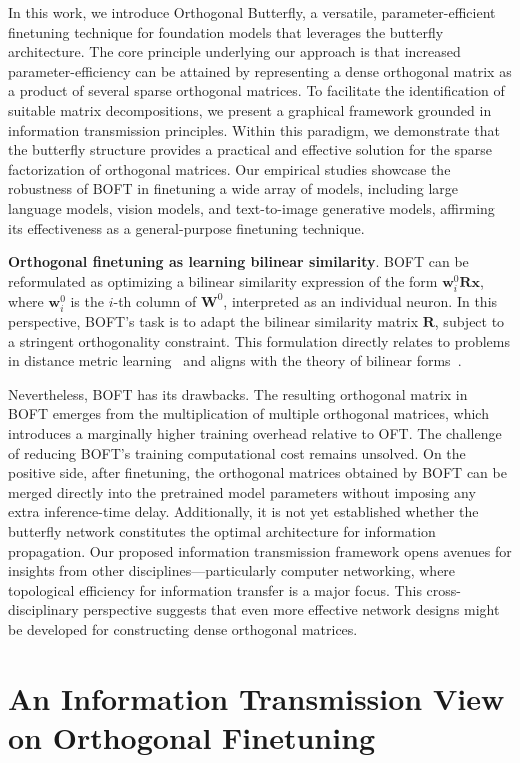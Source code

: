 In this work, we introduce Orthogonal Butterfly, a versatile, parameter-efficient finetuning technique for foundation models that leverages the butterfly architecture. The core principle underlying our approach is that increased parameter-efficiency can be attained by representing a dense orthogonal matrix as a product of several sparse orthogonal matrices. To facilitate the identification of suitable matrix decompositions, we present a graphical framework grounded in information transmission principles. Within this paradigm, we demonstrate that the butterfly structure provides a practical and effective solution for the sparse factorization of orthogonal matrices. Our empirical studies showcase the robustness of BOFT in finetuning a wide array of models, including large language models, vision models, and text-to-image generative models, affirming its effectiveness as a general-purpose finetuning technique.

\textbf{Orthogonal finetuning as learning bilinear similarity}. BOFT can be reformulated as optimizing a bilinear similarity expression of the form $\bm{w}^0_i\bm{R}\bm{x}$, where $\bm{w}^0_i$ is the $i$-th column of $\bm{W}^0$, interpreted as an individual neuron. In this perspective, BOFT’s task is to adapt the bilinear similarity matrix $\bm{R}$, subject to a stringent orthogonality constraint. This formulation directly relates to problems in distance metric learning~\cite{xing2002distance} and aligns with the theory of bilinear forms~\cite{roman2005advanced}.

Nevertheless, BOFT has its drawbacks. The resulting orthogonal matrix in BOFT emerges from the multiplication of multiple orthogonal matrices, which introduces a marginally higher training overhead relative to OFT. The challenge of reducing BOFT's training computational cost remains unsolved. On the positive side, after finetuning, the orthogonal matrices obtained by BOFT can be merged directly into the pretrained model parameters without imposing any extra inference-time delay. Additionally, it is not yet established whether the butterfly network constitutes the optimal architecture for information propagation. Our proposed information transmission framework opens avenues for insights from other disciplines—particularly computer networking, where topological efficiency for information transfer is a major focus. This cross-disciplinary perspective suggests that even more effective network designs might be developed for constructing dense orthogonal matrices.

\section{An Information Transmission View on Orthogonal Finetuning}

